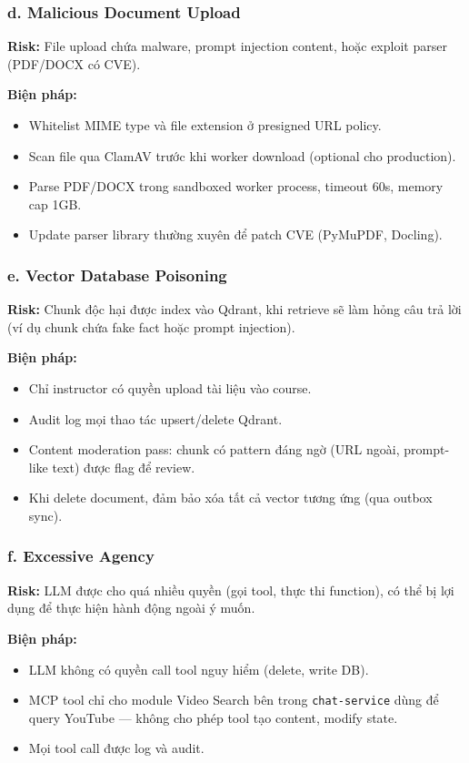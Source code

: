 \subsubsection*{d. Malicious Document Upload}

\textbf{Risk:} File upload chứa malware, prompt injection content, hoặc
exploit parser (PDF/DOCX có CVE).

\textbf{Biện pháp:}
\begin{itemize}
    \item Whitelist MIME type và file extension ở presigned URL policy.
    \item Scan file qua ClamAV trước khi worker download (optional cho
          production).
    \item Parse PDF/DOCX trong sandboxed worker process, timeout 60s, memory
          cap 1GB.
    \item Update parser library thường xuyên để patch CVE (PyMuPDF, Docling).
\end{itemize}

\subsubsection*{e. Vector Database Poisoning}

\textbf{Risk:} Chunk độc hại được index vào Qdrant, khi retrieve sẽ làm
hỏng câu trả lời (ví dụ chunk chứa fake fact hoặc prompt injection).

\textbf{Biện pháp:}
\begin{itemize}
    \item Chỉ instructor có quyền upload tài liệu vào course.
    \item Audit log mọi thao tác upsert/delete Qdrant.
    \item Content moderation pass: chunk có pattern đáng ngờ (URL ngoài,
          prompt-like text) được flag để review.
    \item Khi delete document, đảm bảo xóa tất cả vector tương ứng (qua
          outbox sync).
\end{itemize}

\subsubsection*{f. Excessive Agency}

\textbf{Risk:} LLM được cho quá nhiều quyền (gọi tool, thực thi function),
có thể bị lợi dụng để thực hiện hành động ngoài ý muốn.

\textbf{Biện pháp:}
\begin{itemize}
    \item LLM không có quyền call tool nguy hiểm (delete, write DB).
    \item MCP tool chỉ cho module Video Search bên trong
          \texttt{chat-service} dùng để query YouTube --- không cho phép
          tool tạo content, modify state.
    \item Mọi tool call được log và audit.
\end{itemize}

